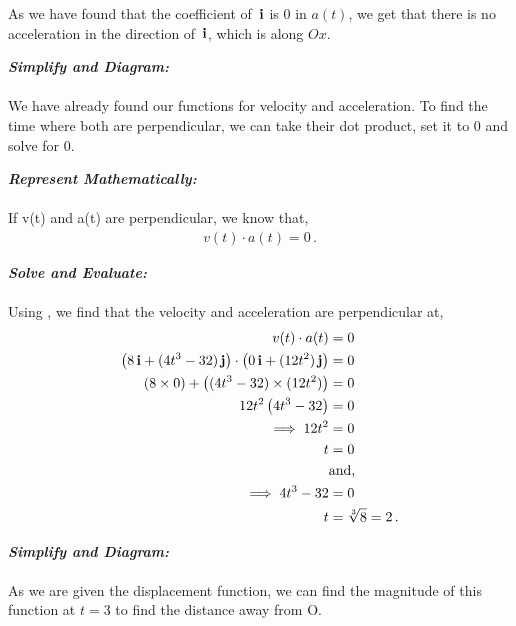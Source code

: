 \begin{subquestions}
\begin{subsubquestions}
As we have found that the coefficient of $\,\mathbf{i}$ is 0 in $a(t)$, we get that there is no acceleration in the direction of $\,\mathbf{i}$, which is along $Ox$. 


\subsubquestion

\textbf{\textit{Simplify and Diagram:}} \\ \\
We have already found our functions for velocity and acceleration. To find the time where both are perpendicular, we can take their dot product, set it to 0 and solve for 0.




\textbf{\textit{Represent Mathematically:}} \\ \\
If v(t) and a(t) are perpendicular, we know that,
\begin{align}
	v(t) \cdot a(t) = 0 \label{2009:q6:DotEqn} \,.
\end{align}




\textbf{\textit{Solve and Evaluate:}} \\ \\
Using , we find that the velocity and acceleration are perpendicular at,
\begin{align}
	v(t) \cdot a(t) & = 0 \nonumber \\
	\left(8\,\mathbf{i} + (4t^3-32)\,\mathbf{j}\right) \cdot \left(0\,\mathbf{i} + (12t^2)\,\mathbf{j} \right) & = 0 \nonumber \\
	\left(8 \times 0\right) + \left((4t^3-32) \times (12t^2)\right) & = 0 \nonumber \\
	12t^2\left(4t^3-32\right) & = 0 \nonumber \\
	\implies 12t^2 & = 0 \nonumber \\
	t & = 0 \\
	& \text{and,} \nonumber \\
	\implies 4t^3-32 & = 0 \nonumber \\
	t & = \sqrt[3]{8} = 2 \,.
\end{align}


\subsubquestion

\textbf{\textit{Simplify and Diagram:}} \\ \\
As we are given the displacement function, we can find the magnitude of this function at $t=3$ to find the distance away from O.





\end{subsubquestions}
\end{subquestions}
